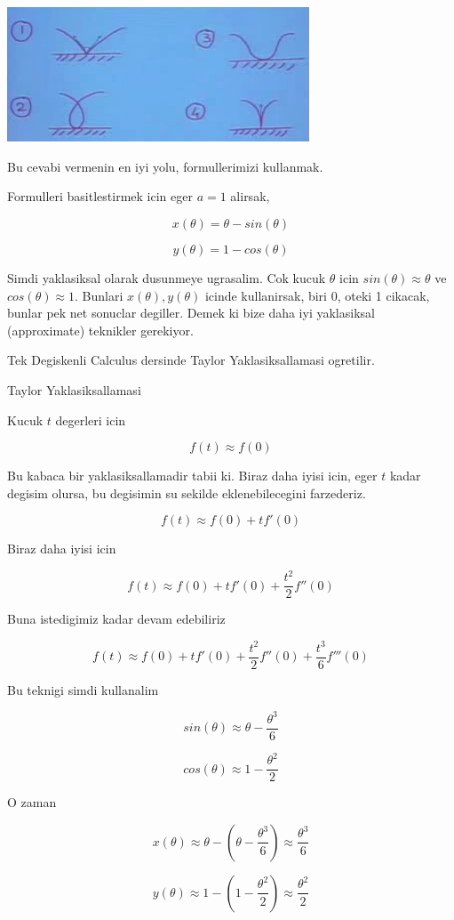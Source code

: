 \documentclass[12pt,fleqn]{article}
\begin{document}
\includegraphics[height=4cm]{5_8.png}

Bu cevabi vermenin en iyi yolu, formullerimizi kullanmak. 

Formulleri basitlestirmek icin eger $a=1$ alirsak, 

\[ x(\theta) = \theta - sin(\theta) \]

\[ y(\theta) = 1 - cos(\theta) \]

Simdi yaklasiksal olarak dusunmeye ugrasalim. Cok kucuk $\theta$ icin
$sin(\theta) \approx \theta$ ve $cos(\theta) \approx 1$. Bunlari
$x(\theta), y(\theta)$ icinde kullanirsak, biri 0, oteki 1 cikacak, bunlar
pek net sonuclar degiller. Demek ki bize daha iyi yaklasiksal (approximate)
teknikler gerekiyor. 

Tek Degiskenli Calculus dersinde Taylor Yaklasiksallamasi ogretilir. 

Taylor Yaklasiksallamasi

Kucuk $t$ degerleri icin 

\[ f(t) \approx f(0) \]

Bu kabaca bir yaklasiksallamadir tabii ki. Biraz daha iyisi icin, eger $t$
kadar degisim olursa, bu degisimin su sekilde eklenebilecegini farzederiz.

\[ f(t) \approx f(0) + tf'(0)\]

Biraz daha iyisi icin

\[ f(t) \approx f(0) + tf'(0) + \frac{t^2}{2}f''(0)\]

Buna istedigimiz kadar devam edebiliriz

\[ f(t) \approx f(0) + tf'(0) + \frac{t^2}{2}f''(0) + \frac{t^3}{6}f'''(0)\]

Bu teknigi simdi kullanalim

\[ sin(\theta) \approx \theta - \frac{\theta^3}{6} \]

\[ cos(\theta) \approx 1 - \frac{\theta^2}{2} \]

O zaman

\[ x(\theta) \approx \theta - (\theta  - \frac{\theta^3}{6}) 
\approx \frac{\theta^3}{6} 
\]

\[ y(\theta) \approx 1 - (1  - \frac{\theta^2}{2}) 
\approx \frac{\theta^2}{2} 
\]
\end{document}
